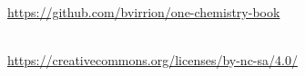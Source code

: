\thispagestyle{empty}
\vspace*{\fill}
\begin{center}
\omcolophonsource\\[2pt]
\url{https://github.com/bvirrion/one-chemistry-book}

\bigskip
\omcolophonlicense\\[2pt]
\url{https://creativecommons.org/licenses/by-nc-sa/4.0/}\\[6pt]
\omcolophoncredit
\end{center}
\vspace*{\fill}
\clearpage
